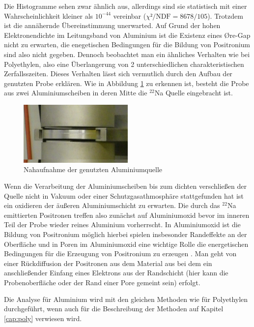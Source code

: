 \documentclass[a4paper,12pt]{article}
\begin{document}
Die Histogramme sehen zwar ähnlich aus, allerdings sind sie statistisch mit einer Wahrscheinlichkeit
kleiner als $10^{-44}$ vereinbar ($χ²/\text{NDF} = 8678/105$).
Trotzdem ist die annähernde Übereinstimmung unerwarted. Auf Grund der hohen Elektronendichte im Leitungsband von Aluminium ist die Existenz eines Øre-Gap nicht zu erwarten, die 
enegetischen Bedingungen für die Bildung von Positronium sind also nicht gegeben. Dennoch beobachtet man ein ähnliches Verhalten wie bei 
Polyethylen, also eine Überlangerung von 2 unterschiedlichen charakteristischen Zerfallsszeiten. Dieses Verhalten lässt sich vermutlich durch
den Aufbau der genutzten Probe erklären.
Wie in Abbildung \ref{fig:quelle_nah} zu erkennen ist,
besteht die Probe aus zwei Aluminiumscheiben in deren Mitte die $^{22}$Na Quelle eingebracht ist.
\begin{figure}
	\centering
	\includegraphics[width=0.5\textwidth]{../pictures/quelle_nah.jpg}
	\caption{Nahaufnahme der genutzten Aluminiumquelle }
	\label{fig:quelle_nah}
\end{figure}


Wenn die Verarbeitung der Aluminiumscheiben bis zum dichten verschließen der Quelle nicht
in Vakuum oder einer Schutzgasathmosphäre stattgefunden hat ist ein oxidieren der äußeren Aluminiumschicht zu erwarten. Die durch das $^{22}$Na
emittierten Positronen treffen also zunächst auf Aluminiumoxid bevor im inneren Teil der Probe wieder reines Aluminium vorherrscht. In Aluminiumoxid
ist die Bildung von Positronium möglich \cite{PhysRevB.70.115410} hierbei spielen insbesonder Randeffekte an der Oberfläche und in Poren im
Aluminiumoxid eine wichtige Rolle die energetischen Bedingungen für die Erzeugung von Positronium zu erzeugen \cite{phd_trezzi}. Man geht von
einer Rückdiffusion der Positronen aus dem Material aus bei dem ein anschließender Einfang eines Elektrons aus der Randschicht 
(hier kann die Probenoberfläche oder der Rand einer Pore gemeint sein) erfolgt.

Die Analyse für Aluminium wird mit den gleichen Methoden wie für Polyethylen durchgeführt, wenn auch für die
Beschreibung der Methoden auf Kapitel \ref{cap:poly} verwiesen wird.
\end{document}
